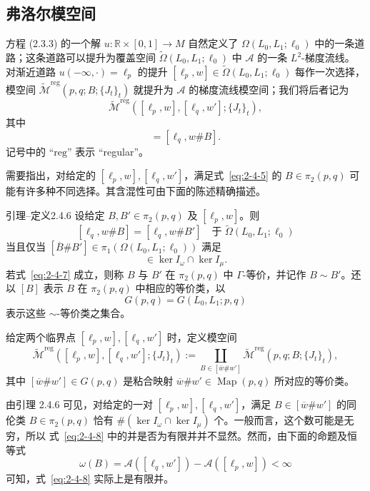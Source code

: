 \subsection{弗洛尔模空间}
\label{sec:2-4-2}

方程 (2.3.3) 的一个解 $u:\mathbb R\times[0,1]\to M$ 自然定义了
$\Omega(L_0,L_1;\ell_0)$ 中的一条道路；这条道路可以提升为覆盖空间
$\widetilde\Omega(L_0,L_1;\ell_0)$ 中 $\mathcal A$ 的一条 $L^2$-梯度流线。
对渐近道路 $u(-\infty,\mathord\cdot)=\ell_p$ 的提升
$[\ell_p,w]\in\widetilde\Omega(L_0,L_1;\ell_0)$ 每作一次选择，模空间
$\widetilde{\mathcal M}^{\mathrm{reg}}(p,q;B;\{J_t\}_t)$ 就提升为
$\mathcal A$ 的梯度流线模空间；我们将后者记为
\[
  \widetilde{\mathcal M}^{\mathrm{reg}}
  ([\ell_p,w],[\ell_q,w'];\{J_t\}_t),
\]
其中
\begin{equation}
  [\ell_q,w']=[\ell_q,w\#B].
  \tag{2.4.5}\label{eq:2-4-5}
\end{equation}
记号中的 ``$\mathrm{reg}$'' 表示 ``regular''。

需要指出，对给定的 $[\ell_p,w],[\ell_q,w']$，满足式~\eqref{eq:2-4-5} 的
$B\in\pi_2(p,q)$ 可能有许多种不同选择。其含混性可由下面的陈述精确描述。

\begin{statement}{引理--定义}{2.4.6}\label{lem-def:2-4-6}
设给定 $B,B'\in\pi_2(p,q)$ 及 $[\ell_p,w]$。则
\[
  [\ell_q,w\#B]=[\ell_q,w\#B']
  \quad\text{于 }\widetilde\Omega(L_0,L_1;\ell_0)
\]
当且仅当 $[\overline B\#B']\in\pi_1(\Omega(L_0,L_1;\ell_0))$ 满足
\begin{equation}
  [\overline B\#B']\in\ker I_\omega\cap\ker I_\mu.
  \tag{2.4.7}\label{eq:2-4-7}
\end{equation}
若式~\eqref{eq:2-4-7} 成立，则称 $B$ 与 $B'$ 在 $\pi_2(p,q)$ 中
$\Gamma$-等价，并记作 $B\sim B'$。还以 $[B]$ 表示 $B$ 在
$\pi_2(p,q)$ 中相应的等价类，以
\[
  G(p,q)=G(L_0,L_1;p,q)
\]
表示这些 $\sim$-等价类之集合。
\end{statement}

给定两个临界点 $[\ell_p,w],[\ell_q,w']$ 时，定义模空间
\begin{equation}
  \widetilde{\mathcal M}^{\mathrm{reg}}
  ([\ell_p,w],[\ell_q,w'];\{J_t\}_t)
  :=\coprod_{B\in[\overline w\#w']}
  \widetilde{\mathcal M}^{\mathrm{reg}}(p,q;B;\{J_t\}_t),
  \tag{2.4.8}\label{eq:2-4-8}
\end{equation}
其中 $[\overline w\#w']\in G(p,q)$ 是粘合映射
$\overline w\#w'\in\operatorname{Map}(p,q)$ 所对应的等价类。

由引理 2.4.6 可见，对给定的一对 $[\ell_p,w],[\ell_q,w']$，满足
$B\in[\overline w\#w']$ 的同伦类 $B\in\pi_2(p,q)$ 恰有
$\#(\ker I_\omega\cap\ker I_\mu)$ 个。一般而言，这个数可能是无穷，所以
式~\eqref{eq:2-4-8} 中的并是否为有限并并不显然。然而，由下面的命题及恒等式
\[
  \omega(B)=\mathcal A([\ell_q,w'])-\mathcal A([\ell_p,w])<\infty
\]
可知，式~\eqref{eq:2-4-8} 实际上是有限并。

